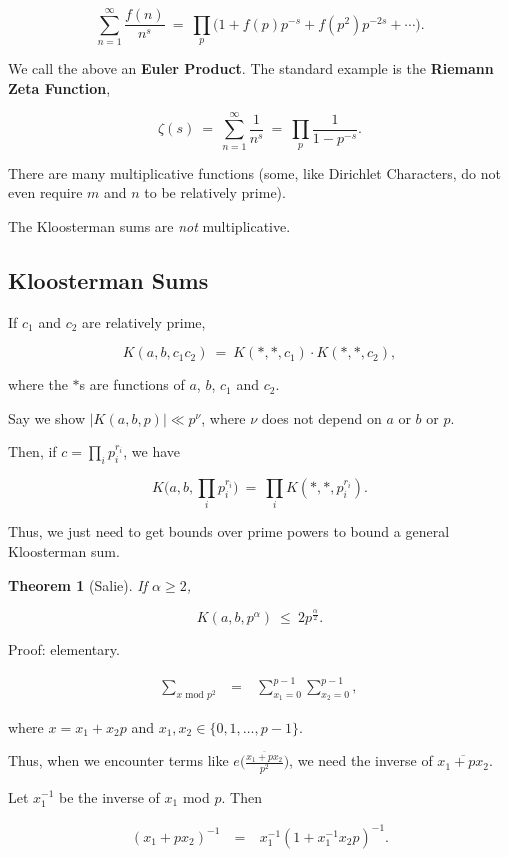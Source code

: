 \documentclass[12pt,letterpaper]{report}
\newcommand\be{\begin{equation}}
\newcommand\ee{\end{equation}}
\newcommand\bea{\begin{eqnarray}}
\newcommand\eea{\end{eqnarray}}
\newcommand{\tbf}[1]{\textbf{#1}}
\newtheorem{thm}{Theorem}[section]
\begin{document}
\be \sum_{n=1}^\infty \frac{f(n)}{n^s} \ = \ \prod_p \Big(1 +
f(p)p^{-s} + f(p^2)p^{-2s} + \cdots \Big). \ee

We call the above an \tbf{Euler Product}. The standard example is
the \tbf{Riemann Zeta Function},

\be \zeta(s) \ = \ \sum_{n=1}^\infty \frac{1}{n^s} \ = \ \prod_p
\frac{1}{1 - p^{-s}}. \ee

There are many multiplicative functions (some, like Dirichlet
Characters, do not even require $m$ and $n$ to be relatively
prime).

The Kloosterman sums are \emph{not} multiplicative.



\subsection{Kloosterman Sums}

If $c_1$ and $c_2$ are relatively prime,

\be K(a,b,c_1c_2) \ = \ K( \ast, \ast, c_1) \cdot K(\ast, \ast,
c_2), \ee

where the $\ast$s are functions of $a$, $b$, $c_1$ and $c_2$.

Say we show $|K(a,b,p)| \ll p^\nu$, where $\nu$ does not depend on
$a$ or $b$ or $p$.

Then, if $c = \prod_i p_i^{r_i}$, we have

\be K\Big(a,b,\prod_i p_i^{r_i}\Big) \ = \ \prod_i K(\ast, \ast,
p_i^{r_i}). \ee

Thus, we just need to get bounds over prime powers to bound a
general Kloosterman sum.

\begin{thm}[Salie] If $\alpha \ge 2$,

\be K(a,b,p^\alpha) \ \le \ 2p^{\frac{\alpha}{2}}. \ee

\end{thm}

Proof: elementary.

\bea \sum_{\text{$x$ mod $p^2$}} &\ = \ & \sum_{x_1=0}^{p-1}
\sum_{x_2 = 0}^{p-1}, \eea

where $x = x_1 + x_2 p$ and $x_1, x_2 \in \{0, 1, \dots, p-1\}$.

Thus, when we encounter terms like $e\Big(\frac{
\overline{x_1+px_2} }{p^2} \Big)$, we need the inverse of
$\overline{x_1 + px_2}$.

Let $x_1^{-1}$ be the inverse of $x_1$ mod $p$. Then

\bea (x_1 + px_2)^{-1} & \ = \ & x_1^{-1}(1 + x_1^{-1}x_2p)^{-1}.
\eea
\end{document}
